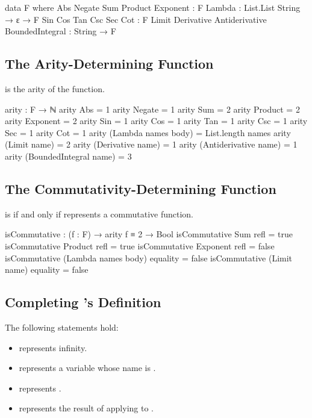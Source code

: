 \documentclass{report}
\begin{document}
\begin{code}
data F where
  Abs
   Negate
   Sum
   Product
   Exponent : F
  Lambda : List.List String → ε → F
  Sin
   Cos
   Tan
   Csc
   Sec
   Cot : F
  Limit
   Derivative
   Antiderivative
   BoundedIntegral : String → F
\end{code}

\subsection{The Arity-Determining Function}
  is the arity of the  function.

\begin{code}
arity : F → ℕ
arity Abs = 1
arity Negate = 1
arity Sum = 2
arity Product = 2
arity Exponent = 2
arity Sin = 1
arity Cos = 1
arity Tan = 1
arity Csc = 1
arity Sec = 1
arity Cot = 1
arity (Lambda names body) = List.length names
arity (Limit name) = 2
arity (Derivative name) = 1
arity (Antiderivative name) = 1
arity (BoundedIntegral name) = 3
\end{code}

\subsection{The Commutativity-Determining Function}
   is  if and only if  represents a commutative function.

\begin{code}
isCommutative : (f : F) → arity f ≡ 2 → Bool
isCommutative Sum refl = true
isCommutative Product refl = true
isCommutative Exponent refl = false
isCommutative (Lambda names body) equality = false
isCommutative (Limit name) equality = false
\end{code}

\subsection{Completing 's Definition}
The following statements hold:

\begin{itemize}
  \item {} represents infinity.
  \item {}  represents a variable whose name is .
  \item {}  represents .
  \item {}   represents the result of applying  to .
\end{itemize}
\end{document}
